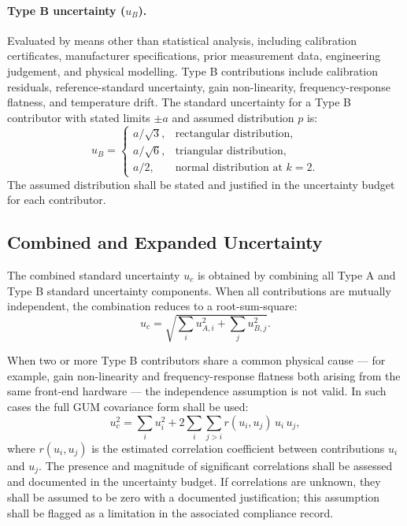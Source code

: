\documentclass[11pt]{article}
\begin{document}
\paragraph{Type B uncertainty ($u_B$).} Evaluated by means other than statistical analysis, including calibration certificates, manufacturer specifications, prior measurement data, engineering judgement, and physical modelling. Type B contributions include calibration residuals, reference-standard uncertainty, gain non-linearity, frequency-response flatness, and temperature drift. The standard uncertainty for a Type B contributor with stated limits $\pm a$ and assumed distribution $p$ is:
\begin{equation}
u_B = \begin{cases}
a/\sqrt{3}, & \text{rectangular distribution}, \\
a/\sqrt{6}, & \text{triangular distribution}, \\
a/2, & \text{normal distribution at } k=2.
\end{cases}
\label{eq:typeB}
\end{equation}
The assumed distribution shall be stated and justified in the uncertainty budget for each contributor.

\subsection*{Combined and Expanded Uncertainty}

The combined standard uncertainty $u_c$ is obtained by combining all Type A and Type B standard uncertainty components. When all contributions are mutually independent, the combination reduces to a root-sum-square:
\begin{equation}
u_c = \sqrt{\sum_i u_{A,i}^2 + \sum_j u_{B,j}^2}.
\label{eq:combined}
\end{equation}

When two or more Type B contributors share a common physical cause --- for example, gain non-linearity and frequency-response flatness both arising from the same front-end hardware --- the independence assumption is not valid. In such cases the full GUM covariance form shall be used:
\begin{equation}
u_c^2 = \sum_i u_i^2 + 2 \sum_i \sum_{j>i} r(u_i, u_j)\, u_i\, u_j,
\label{eq:covariance}
\end{equation}
where $r(u_i, u_j)$ is the estimated correlation coefficient between contributions $u_i$ and $u_j$. The presence and magnitude of significant correlations shall be assessed and documented in the uncertainty budget. If correlations are unknown, they shall be assumed to be zero with a documented justification; this assumption shall be flagged as a limitation in the associated compliance record.
\end{document}
